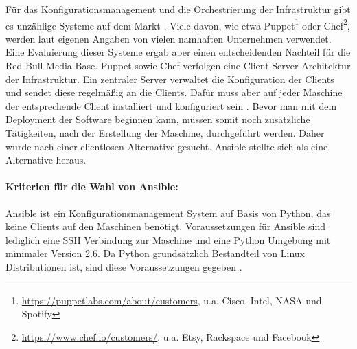 Für das Konfigurationsmanagement und die Orchestrierung der Infrastruktur gibt es unzählige Systeme auf dem Markt \cite{skelton2014}. Viele davon, wie etwa Puppet\footnote{\url{https://puppetlabs.com/about/customers}, u.a. Cisco, Intel, NASA und Spotify} oder Chef\footnote{\url{https://www.chef.io/customers/}, u.a. Etsy, Rackspace und Facebook}, werden laut eigenen Angaben von vielen namhaften Unternehmen verwendet. Eine Evaluierung dieser Systeme ergab aber einen entscheidenden Nachteil für die Red Bull Media Base. Puppet sowie Chef verfolgen eine Client-Server Architektur der Infrastruktur. Ein zentraler Server verwaltet die Konfiguration der Clients und sendet diese regelmäßig an die Clients. Dafür muss aber auf jeder Maschine der entsprechende Client installiert und konfiguriert sein \cite{pandey2012}. Bevor man mit dem Deployment der Software beginnen kann, müssen somit noch zusätzliche Tätigkeiten, nach der Erstellung der Maschine, durchgeführt werden. Daher wurde nach einer clientlosen Alternative gesucht. Ansible stellte sich als eine Alternative heraus.

\paragraph{Kriterien für die Wahl von Ansible:}
Ansible ist ein Konfigurationsmanagement System auf Basis von Python, das keine Clients auf den Maschinen benötigt. Voraussetzungen für Ansible sind lediglich eine SSH Verbindung zur Maschine und eine Python Umgebung mit minimaler Version 2.6. Da Python grundsätzlich Bestandteil von Linux Distributionen ist, sind diese Voraussetzungen gegeben \cite{ansible2014, hall2013}.

